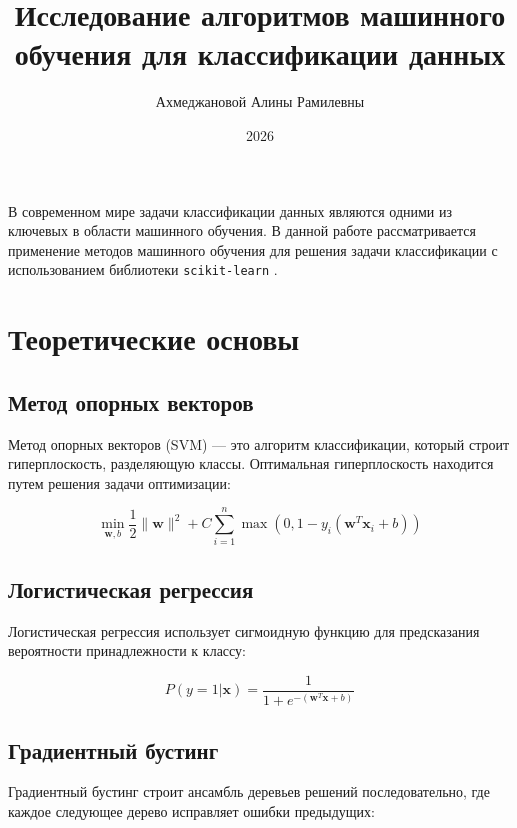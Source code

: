 \documentclass[coursework]{SCWorks}
\title{Исследование алгоритмов машинного обучения для классификации данных}
\author{Ахмеджановой Алины Рамилевны}
\date{2026}
\begin{document}
\maketitle
\tableofcontents

\intro

В современном мире задачи классификации данных являются одними из ключевых в области машинного обучения. В данной работе рассматривается применение методов машинного обучения для решения задачи классификации с использованием библиотеки \texttt{scikit-learn} \cite{henrick2017ml}.

\section{Теоретические основы}

\subsection{Метод опорных векторов}

Метод опорных векторов (SVM) — это алгоритм классификации, который строит гиперплоскость, разделяющую классы. Оптимальная гиперплоскость находится путем решения задачи оптимизации:

\begin{equation}
\min_{\mathbf{w}, b} \frac{1}{2} \|\mathbf{w}\|^2 + C \sum_{i=1}^{n} \max(0, 1 - y_i(\mathbf{w}^T \mathbf{x}_i + b))
\label{eq:svm}
\end{equation}

\subsection{Логистическая регрессия}

Логистическая регрессия использует сигмоидную функцию для предсказания вероятности принадлежности к классу:

\begin{equation}
P(y=1|\mathbf{x}) = \frac{1}{1 + e^{-(\mathbf{w}^T \mathbf{x} + b)}}
\label{eq:sigmoid}
\end{equation}

\subsection{Градиентный бустинг}

Градиентный бустинг строит ансамбль деревьев решений последовательно, где каждое следующее дерево исправляет ошибки предыдущих:
\end{document}

